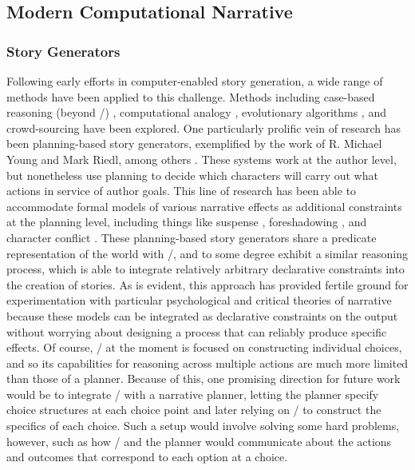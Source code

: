 \subsection{Modern Computational Narrative}


\subsubsection{Story Generators}

Following early efforts in computer-enabled story generation, a wide range of methods have been applied to this challenge.
%
Methods including case-based reasoning (beyond \minstrel/) \citep{Gervas2005}, computational analogy \citep{Zhu2010}, evolutionary algorithms \citep{Bui2010}, and crowd-sourcing \citep{Li2013} have been explored.
%
One particularly prolific vein of research has been planning-based story generators, exemplified by the work of R. Michael Young and Mark Riedl, among others \citep{Young1999,Riedl2004}.
%
These systems work at the author level, but nonetheless use planning to decide which characters will carry out what actions in service of author goals.
%
This line of research has been able to accommodate formal models of various narrative effects as additional constraints at the planning level, including things like suspense \citep{Cheong2006}, foreshadowing \citep{Bae2008}, and character conflict \citep{Ware2014}.
%
These planning-based story generators share a predicate representation of the world with \dunyazad/, and to some degree exhibit a similar reasoning process, which is able to integrate relatively arbitrary declarative constraints into the creation of stories.
%
As is evident, this approach has provided fertile ground for experimentation with particular psychological and critical theories of narrative because these models can be integrated as declarative constraints on the output without worrying about designing a process that can reliably produce specific effects.
%
Of course, \dunyazad/ at the moment is focused on constructing individual choices, and so its capabilities for reasoning across multiple actions are much more limited than those of a planner.
%
Because of this, one promising direction for future work would be to integrate \dunyazad/ with a narrative planner, letting the planner specify choice structures at each choice point and later relying on \dunyazad/ to construct the specifics of each choice.
%
Such a setup would involve solving some hard problems, however, such as how \dunyazad/ and the planner would communicate about the actions and outcomes that correspond to each option at a choice.


